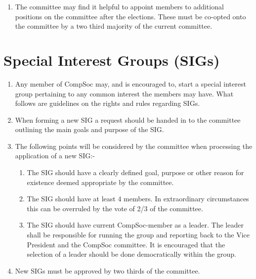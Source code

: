 \documentclass{article}
\begin{document}
\begin {enumerate}
    \item The committee may find it helpful to appoint members to additional positions
      on the committee after the elections. These must be co-opted onto the committee by a two
      third majority of the current committee.

\end{enumerate}


\newpage{}
\section{Special Interest Groups (SIGs)}

\begin{enumerate}

  \item Any member of CompSoc may, and is encouraged to, start a special interest
    group pertaining to any common interest the members may have.
    What follows are guidelines on the rights and rules regarding SIGs.

  \item When forming a new SIG a request should be handed in to the committee
    outlining the main goals and purpose of the SIG.

  \item The following points will be considered by the committee when processing
    the application of a new SIG:-
    \begin{enumerate}
      \item The SIG should have a clearly defined goal, purpose or other reason
      for existence deemed appropriate by the committee.
      \item The SIG should have at least 4 members. In extraordinary circumstances
      this can be overruled by the vote of 2/3 of the committee.
      \item The SIG should have current CompSoc-member as a leader. The
      leader shall be responsible for running the group and reporting back
      to the Vice President and the CompSoc committee. It is encouraged
      that the selection of a leader should be done democratically within the
      group.
    \end{enumerate}

  \item New SIGs must be approved by two thirds of the committee.


\end{enumerate}
\end{document}
